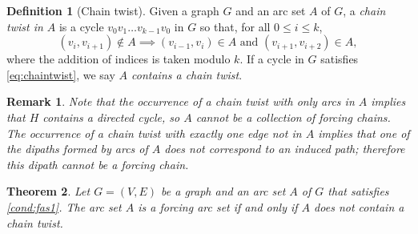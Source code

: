 \documentclass[12pt]{amsart}
\theoremstyle{plain}
\newtheorem{theorem}{Theorem}[section]
\newtheorem{remark}[theorem]{Remark}
\theoremstyle{definition}
\newtheorem{definition}{Definition}[section]
\begin{document}
\begin{definition}[Chain twist]\label{def:chain twist}
Given a graph $G$ and an arc set $A$ of $G$, a \emph{chain twist in $A$} is a cycle $v_0v_1\dots v_{k-1}v_0$ in $G$ so that, for all $0\leq i\le k$, 
\begin{equation}\label{eq:chaintwist}\tag{CT}
    (v_{i},v_{i+1})\not\in A\implies (v_{i-1},v_{i})\in A\text{ and }(v_{i+1},v_{i+2})\in A,
\end{equation}
where the addition of indices is taken modulo $k$.
If a cycle in $G$ satisfies \eqref{eq:chaintwist}, we say {\em $A$ contains a chain twist}.
\end{definition}
\begin{remark}\label{rmk:remark-ct}
Note that the occurrence of a chain twist with only arcs in $A$ implies that $H$ contains a directed cycle, so $A$ cannot be a collection of forcing chains. 
The occurrence of a chain twist with exactly one edge not in $A$ implies that one of the dipaths formed by arcs of $A$ does not correspond to an induced path; therefore this dipath cannot be a forcing chain.
\end{remark}


\begin{theorem}\label{thm:chaintwist}
Let $G=(V, E)$ be a graph and an arc set $A$ of $G$ that satisfies \ref{cond:fas1}. 
The arc set $A$ is a forcing arc set if and only if $A$ does not contain a chain twist. 
\end{theorem}
\end{document}
